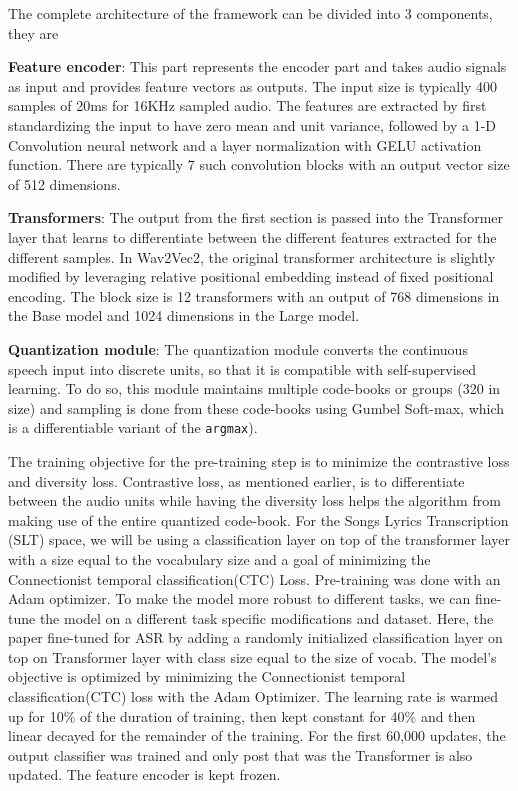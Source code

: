 The complete architecture of the framework can be divided into 3 components, they are

\textbf{Feature encoder}: This part represents the encoder part and takes audio signals as input and provides feature vectors as outputs. The input size is typically 400 samples of 20ms for 16KHz sampled audio. The features are extracted by first standardizing the input to have zero mean and unit variance, followed by a 1-D Convolution neural network and a layer normalization with GELU activation function. There are typically 7 such convolution blocks with an output vector size of 512 dimensions. 

\textbf{Transformers}: The output from the first section is passed into the Transformer layer that learns to differentiate between the different features extracted for the different samples. In Wav2Vec2, the original transformer architecture is slightly modified by leveraging relative positional embedding instead of fixed positional encoding. The block size is 12 transformers with an output of 768 dimensions in the Base model and 1024 dimensions in the Large model. 

\textbf{Quantization module}: The quantization module converts the continuous speech input into discrete units, so that it is compatible with self-supervised learning. To do so, this module maintains multiple code-books or groups (320 in size) and sampling is done from these code-books using Gumbel Soft-max, which is a differentiable variant of the \texttt{argmax}). 

The training objective for the pre-training step is to minimize the contrastive loss and diversity loss. Contrastive loss, as mentioned earlier, is to differentiate between the audio units while having the diversity loss helps the algorithm from making use of the entire quantized code-book. For the Songs Lyrics Transcription (SLT) space, we will be using a classification layer on top of the transformer layer with a size equal to the vocabulary size and a goal of minimizing the Connectionist temporal classification(CTC) Loss. Pre-training was done with an Adam optimizer. 
To make the model more robust to different tasks, we can fine-tune the model on a different task specific modifications and dataset. Here, the paper fine-tuned for ASR by adding a randomly initialized classification layer on top on Transformer layer with class size equal to the size of vocab. The model's objective is optimized by minimizing the Connectionist temporal classification(CTC) loss with the Adam Optimizer. The learning rate is warmed up for 10\% of the duration of training, then kept constant for 40\% and then linear decayed for the remainder of the training. For the first 60,000 updates, the output classifier was trained and only post that was the Transformer is also updated. The feature encoder is kept frozen.

